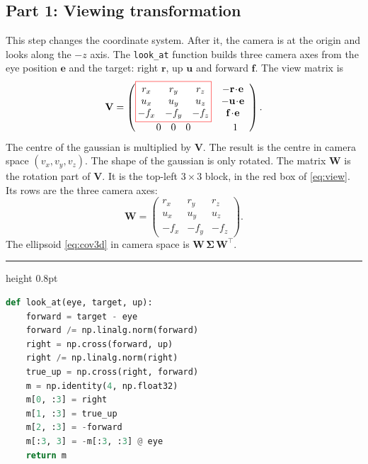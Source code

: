 \documentclass[9pt,twocolumn,a4paper]{extarticle}
\newenvironment{codebox}{\par\vspace{5pt}\noindent\begin{minipage}{\columnwidth}\hrule height 0.8pt\vspace{2pt}}{\end{minipage}\par\vspace{5pt}\noindent\ignorespaces}
\newcommand{\code}[1]{\texttt{#1}}
\newcommand{\Sig}{\symbf{\Sigma}}
\begin{document}
\subsection{Part 1: Viewing transformation}
\label{sec:cam}
This step changes the coordinate system. After it, the camera is at the origin and looks along the $-z$ axis. The \code{look\_at} function builds three camera axes from the eye position $\mathbf{e}$ and the target: right $\mathbf{r}$, up $\mathbf{u}$ and forward $\mathbf{f}$. The view matrix is
\begin{equation}
\mathbf{V}=\begin{pmatrix}
\setlength{\fboxsep}{2pt}\fcolorbox{red}{white}{$\begin{matrix}
r_x&r_y&r_z\\u_x&u_y&u_z\\-f_x&-f_y&-f_z\end{matrix}$}
&\begin{matrix}-\mathbf{r}\!\cdot\!\mathbf{e}\\-\mathbf{u}\!\cdot\!\mathbf{e}\\ \mathbf{f}\!\cdot\!\mathbf{e}\end{matrix}\\[3mm]
\begin{matrix}0&0&0\end{matrix}&1\end{pmatrix}.
\label{eq:view}
\end{equation}
The centre of the gaussian is multiplied by $\mathbf{V}$. The result is the centre in camera space $(v_x,v_y,v_z)$. The shape of the gaussian is only rotated. The matrix $\mathbf{W}$ is the rotation part of $\mathbf{V}$. It is the top-left $3\times3$ block, in the red box of \eqref{eq:view}. Its rows are the three camera axes:
\begin{equation}
\mathbf{W}=\begin{pmatrix}
r_x&r_y&r_z\\u_x&u_y&u_z\\-f_x&-f_y&-f_z\end{pmatrix}.
\label{eq:W}
\end{equation}
The ellipsoid \eqref{eq:cov3d} in camera space is $\mathbf{W}\,\Sig\,\mathbf{W}^{\top}$.

\begin{codebox}
\begin{lstlisting}[language=Python,caption={\code{core/math3d.py}, \code{look\_at}: view matrix $\mathbf{V}$},label={lst:lookat}]
def look_at(eye, target, up):
    forward = target - eye
    forward /= np.linalg.norm(forward)
    right = np.cross(forward, up)
    right /= np.linalg.norm(right)
    true_up = np.cross(right, forward)
    m = np.identity(4, np.float32)
    m[0, :3] = right
    m[1, :3] = true_up
    m[2, :3] = -forward
    m[:3, 3] = -m[:3, :3] @ eye
    return m
\end{lstlisting}
\end{codebox}
\end{document}

